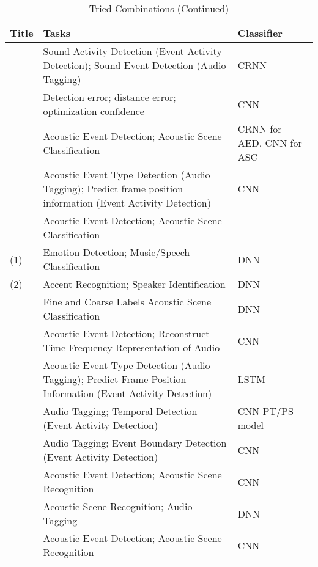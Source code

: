 \begin{table}[ht]
	\caption{Tried Combinations (Continued)} %
	\centering %
	\begin{tabular}{p{}p{}p{}} %
		\hline\hline %
		Title & Tasks & Classifier   \\ [0.5ex] %
		\hline %
		\citet{pankajakshan2019polyphonic} & Sound Activity Detection (Event Activity Detection); Sound Event Detection (Audio Tagging) & CRNN \\ \hline
		\citet{phan2019unifying} & 	Detection error; distance error; optimization confidence & CNN \\ \hline
		\citet{tonami2019joint} & Acoustic Event Detection; Acoustic Scene Classification & CRNN for AED, CNN for ASC  \\ \hline
		\citet{xia2019multi} & Acoustic Event Type Detection (Audio Tagging); Predict frame position information (Event Activity Detection) & CNN \\ \hline
		\citet{xu2019multi} & Acoustic Event Detection; Acoustic Scene Classification & \\ \hline
		\citet{zeng2019spectrogram} (1) & Emotion Detection; Music/Speech Classification & DNN \\ \hline
		\citet{zeng2019spectrogram} (2) & Accent Recognition; Speaker Identification & DNN \\ \hline
		\citet{abrol2020learning} & Fine and Coarse Labels Acoustic Scene Classification & DNN \\ \hline
		\citet{deshmukh2020multi} & Acoustic Event Detection; Reconstruct Time Frequency Representation of Audio &  CNN \\ \hline
		\citet{fernando2020temporarily} & Acoustic Event Type Detection (Audio Tagging); Predict Frame Position Information (Event Activity Detection) & LSTM \\ \hline
		\citet{huang2020guided} & Audio Tagging; Temporal Detection (Event Activity Detection) & CNN PT/PS model \\ \hline
		\citet{huang2020multi} & Audio Tagging; Event Boundary Detection (Event Activity Detection) & CNN \\ \hline
		\citet{imoto2020sound} & Acoustic Event Detection; Acoustic Scene Recognition & CNN \\ \hline
		\citet{jung2020acoustic} & Acoustic Scene Recognition; Audio Tagging & DNN \\ \hline
		\citet{komatsu2020scene} & Acoustic Event Detection; Acoustic Scene Recognition & CNN \\ \hline
			\end{tabular}
	\label{table:combinations2} %
\end{table}

